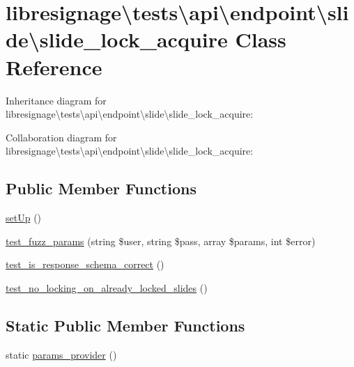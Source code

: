 \hypertarget{classlibresignage_1_1tests_1_1api_1_1endpoint_1_1slide_1_1slide__lock__acquire}{}\section{libresignage\textbackslash{}tests\textbackslash{}api\textbackslash{}endpoint\textbackslash{}slide\textbackslash{}slide\+\_\+lock\+\_\+acquire Class Reference}
\label{classlibresignage_1_1tests_1_1api_1_1endpoint_1_1slide_1_1slide__lock__acquire}


Inheritance diagram for libresignage\textbackslash{}tests\textbackslash{}api\textbackslash{}endpoint\textbackslash{}slide\textbackslash{}slide\+\_\+lock\+\_\+acquire\+:


Collaboration diagram for libresignage\textbackslash{}tests\textbackslash{}api\textbackslash{}endpoint\textbackslash{}slide\textbackslash{}slide\+\_\+lock\+\_\+acquire\+:
\subsection*{Public Member Functions}
\begin{DoxyCompactItemize}
\item 
\hyperlink{classlibresignage_1_1tests_1_1api_1_1endpoint_1_1slide_1_1slide__lock__acquire_a05f51dca134f4b424b86065065eac82e}{set\+Up} ()
\item 
\hyperlink{classlibresignage_1_1tests_1_1api_1_1endpoint_1_1slide_1_1slide__lock__acquire_a956a5a12eab1016708cfbc308afdf42a}{test\+\_\+fuzz\+\_\+params} (string \$user, string \$pass, array \$params, int \$error)
\item 
\hyperlink{classlibresignage_1_1tests_1_1api_1_1endpoint_1_1slide_1_1slide__lock__acquire_a695ea262eeb57516a688c53be06dbbc3}{test\+\_\+is\+\_\+response\+\_\+schema\+\_\+correct} ()
\item 
\hyperlink{classlibresignage_1_1tests_1_1api_1_1endpoint_1_1slide_1_1slide__lock__acquire_a0616e0ef36c6472125422912ccd609fd}{test\+\_\+no\+\_\+locking\+\_\+on\+\_\+already\+\_\+locked\+\_\+slides} ()
\end{DoxyCompactItemize}
\subsection*{Static Public Member Functions}
\begin{DoxyCompactItemize}
\item 
static \hyperlink{classlibresignage_1_1tests_1_1api_1_1endpoint_1_1slide_1_1slide__lock__acquire_a9cf9f2d856657193d9a91ec3cbcb17c7}{params\+\_\+provider} ()
\end{DoxyCompactItemize}
